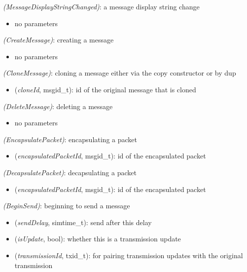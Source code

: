  \textit{(MessageDisplayStringChanged)}: a message display string change

\begin{itemize}
  \item no parameters
\end{itemize}

 \textit{(CreateMessage)}: creating a message

\begin{itemize}
  \item no parameters
\end{itemize}

 \textit{(CloneMessage)}: cloning a message either via the copy constructor or by dup

\begin{itemize}
  \item {} (\textit{cloneId}, msgid\_t): id of the original message that is cloned
\end{itemize}

 \textit{(DeleteMessage)}: deleting a message

\begin{itemize}
  \item no parameters
\end{itemize}

 \textit{(EncapsulatePacket)}: encapsulating a packet

\begin{itemize}
  \item {} (\textit{encapsulatedPacketId}, msgid\_t): id of the encapsulated packet
\end{itemize}

 \textit{(DecapsulatePacket)}: decapsulating a packet

\begin{itemize}
  \item {} (\textit{encapsulatedPacketId}, msgid\_t): id of the encapsulated packet
\end{itemize}

 \textit{(BeginSend)}: beginning to send a message

\begin{itemize}
  \item {} (\textit{sendDelay}, simtime\_t): send after this delay
  \item {} (\textit{isUpdate}, bool): whether this is a transmission update
  \item {} (\textit{transmissionId}, txid\_t): for pairing transmission updates with the original transmission
\end{itemize}

